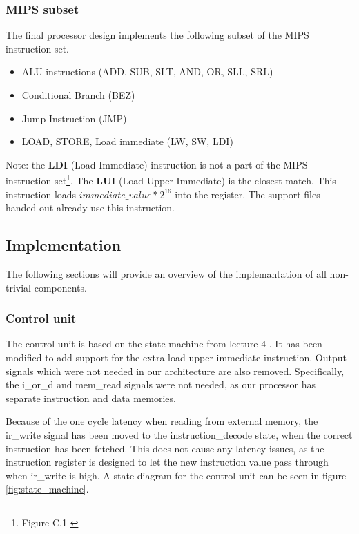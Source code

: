 \subsubsection{MIPS subset}

The final processor design implements the following subset of the MIPS instruction set.

\begin{itemize}
    \item ALU instructions (ADD, SUB, SLT, AND, OR, SLL, SRL)
    \item Conditional Branch (BEZ)
    \item Jump Instruction (JMP)
    \item LOAD, STORE, Load immediate (LW, SW, LDI)
\end{itemize}

Note: the {\bf LDI} (Load Immediate) instruction is not a part of the MIPS instruction set\footnote{Figure C.1 \cite[p.66]{compendium}}.
The {\bf LUI} (Load Upper Immediate) is the closest match.
This instruction loads $ immediate\_value * 2 ^{16} $ into the register.
The support files handed out already use this instruction.

\subsection{Implementation}

The following sections will provide an overview of the implemantation of all non-trivial components.

\subsubsection{Control unit}

The control unit is based on the state machine from lecture 4 \cite{lecture-4}.
It has been modified to add support for the extra load upper immediate instruction.
Output signals which were not needed in our architecture are also removed.
Specifically, the i\_or\_d and mem\_read signals were not needed, as our processor has separate instruction and data memories.

Because of the one cycle latency when reading from external memory, the ir\_write signal has been moved to the instruction\_decode state, when the correct instruction has been fetched.
This does not cause any latency issues, as the instruction register is designed to let the new instruction value pass through when ir\_write is high.
A state diagram for the control unit can be seen in figure \ref{fig:state_machine}.

